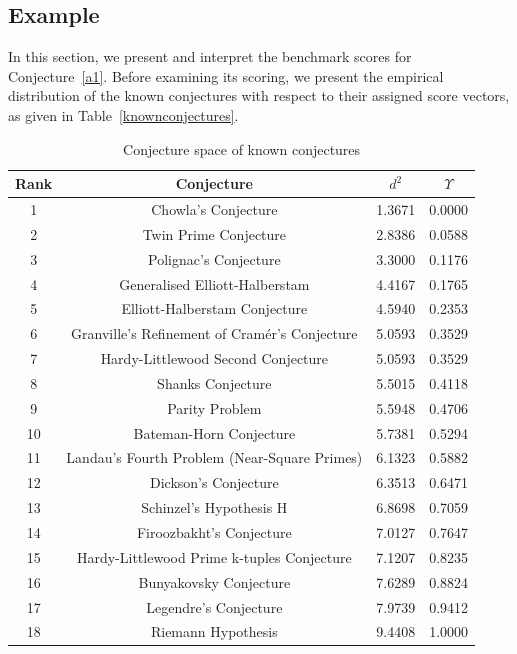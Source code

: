 \documentclass[11pt,reqno]{amsart}
\theoremstyle{plain}\newtheorem{theorem}{Theorem}[section]
\numberwithin{equation}{section}
\begin{document}
\subsection{Example}\label{benchmarkexample}
In this section, we present and interpret the benchmark scores for Conjecture~\ref{a1}. Before examining its scoring, we present the empirical distribution of the known conjectures with respect to their assigned score vectors, as given in Table~\ref{knownconjectures}.

\begin{table}[ht]
\centering
\begin{tabular}{|c|c|c|c|}
\hline
Rank & Conjecture & $d^2$ & $\Upsilon$ \\
\hline
1  & Chowla's Conjecture & 1.3671 & 0.0000 \\
\hline
2  & Twin Prime Conjecture & 2.8386 & 0.0588 \\
\hline
3  & Polignac's Conjecture & 3.3000 & 0.1176 \\
\hline
4  & Generalised Elliott-Halberstam & 4.4167 & 0.1765 \\
\hline
5  & Elliott-Halberstam Conjecture & 4.5940 & 0.2353 \\
\hline
6  & Granville's Refinement of Cram\'{e}r's Conjecture & 5.0593 & 0.3529 \\
\hline
7  & Hardy-Littlewood Second Conjecture & 5.0593 & 0.3529 \\
\hline
8  & Shanks Conjecture & 5.5015 & 0.4118 \\
\hline
9  & Parity Problem & 5.5948 & 0.4706 \\
\hline
10 & Bateman-Horn Conjecture & 5.7381 & 0.5294 \\
\hline
11 & Landau's Fourth Problem (Near-Square Primes) & 6.1323 & 0.5882 \\
\hline
12 & Dickson's Conjecture & 6.3513 & 0.6471 \\
\hline
13 & Schinzel's Hypothesis H & 6.8698 & 0.7059 \\
\hline
14 & Firoozbakht's Conjecture & 7.0127 & 0.7647 \\
\hline
15 & Hardy-Littlewood Prime k-tuples Conjecture & 7.1207 & 0.8235 \\
\hline
16 & Bunyakovsky Conjecture & 7.6289 & 0.8824 \\
\hline
17 & Legendre's Conjecture & 7.9739 & 0.9412 \\
\hline
18 & Riemann Hypothesis & 9.4408 & 1.0000 \\
\hline
\end{tabular}
\caption{Conjecture space of known conjectures}
\label{conjecturespace}
\end{table}
\end{document}
